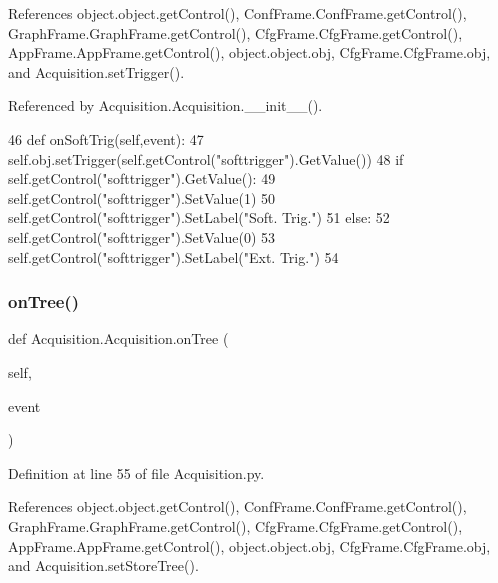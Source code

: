 References object.\+object.\+get\+Control(), Conf\+Frame.\+Conf\+Frame.\+get\+Control(), Graph\+Frame.\+Graph\+Frame.\+get\+Control(), Cfg\+Frame.\+Cfg\+Frame.\+get\+Control(), App\+Frame.\+App\+Frame.\+get\+Control(), object.\+object.\+obj, Cfg\+Frame.\+Cfg\+Frame.\+obj, and Acquisition.\+set\+Trigger().



Referenced by Acquisition.\+Acquisition.\+\_\+\+\_\+init\+\_\+\+\_\+().


\begin{DoxyCode}
46     \textcolor{keyword}{def }onSoftTrig(self,event):
47         self.obj.setTrigger(self.getControl(\textcolor{stringliteral}{"softtrigger"}).GetValue())
48         \textcolor{keywordflow}{if} self.getControl(\textcolor{stringliteral}{"softtrigger"}).GetValue():
49             self.getControl(\textcolor{stringliteral}{"softtrigger"}).SetValue(1)
50             self.getControl(\textcolor{stringliteral}{"softtrigger"}).SetLabel(\textcolor{stringliteral}{"Soft. Trig."})
51         \textcolor{keywordflow}{else}:
52             self.getControl(\textcolor{stringliteral}{"softtrigger"}).SetValue(0)
53             self.getControl(\textcolor{stringliteral}{"softtrigger"}).SetLabel(\textcolor{stringliteral}{"Ext. Trig."})
54 
\end{DoxyCode}
\mbox{\label{classAcquisition_1_1Acquisition_a9d82c40d0be476e1f4b9a8ec0f6ea29a}} 
\subsubsection{\texorpdfstring{on\+Tree()}{onTree()}}
{\footnotesize\ttfamily def Acquisition.\+Acquisition.\+on\+Tree (\begin{DoxyParamCaption}\item[{}]{self,  }\item[{}]{event }\end{DoxyParamCaption})}



Definition at line 55 of file Acquisition.\+py.



References object.\+object.\+get\+Control(), Conf\+Frame.\+Conf\+Frame.\+get\+Control(), Graph\+Frame.\+Graph\+Frame.\+get\+Control(), Cfg\+Frame.\+Cfg\+Frame.\+get\+Control(), App\+Frame.\+App\+Frame.\+get\+Control(), object.\+object.\+obj, Cfg\+Frame.\+Cfg\+Frame.\+obj, and Acquisition.\+set\+Store\+Tree().




